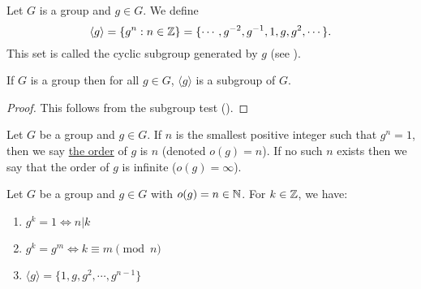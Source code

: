 \documentclass[11pt]{article}
\begin{document}
\begin{definition}
    Let $G$ is a group and $g\in G$. We define
    \[\langle g\rangle=\{g^n:n\in\mathbb{Z}\}=\{\cdots,g^{-2},g^{-1},1,g,g^2,\cdots\}.\]
    This set is called the cyclic subgroup generated by $g$ (see ).
\end{definition}

\begin{proposition}
    If $G$ is a group then for all $g\in G$, $\langle g\rangle$ is a subgroup of $G$.
\end{proposition}

\begin{proof}
    This follows from the subgroup test ().
\end{proof}

\begin{definition}
    Let $G$ be a group and $g\in G$. If $n$ is the smallest positive integer such that $g^n=1$, then we say \ul{the order} of $g$ is $n$ (denoted $o(g)=n$). If no such $n$ exists then we say that the order of $g$ is infinite ($o(g)=\infty$).
\end{definition}

\begin{proposition}
    Let $G$ be a group and $g\in G$ with $o(g)=n\in\mathbb{N}$. For $k\in\mathbb{Z}$, we have:
    \begin{enumerate}
        \item $g^k=1\iff n|k$
        \item $g^k=g^m\iff k\equiv m\pmod{n}$
        \item $\langle g\rangle=\{1,g,g^2,\cdots,g^{n-1}\}$
    \end{enumerate}
\end{proposition}
\end{document}

